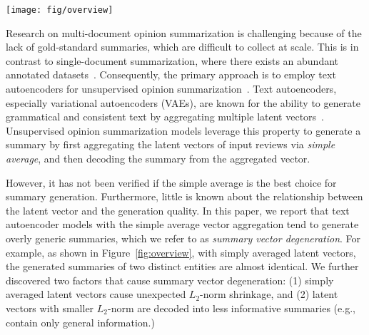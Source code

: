 \documentclass[11pt]{article}
\newcommand{\aggname}{\textsc{Coop}}
\newcommand{\hl}[1]{#1}
\begin{document}
\begin{figure*}[t]
    \centering
    \texttt{[image: fig/overview]}
    \caption{
    Illustration of the latent space $\mathcal{Z}$ and text space $\mathcal{X}$.
    The de facto standard approach in unsupervised opinion summarization uses the simple average of input review vectors $\boldsymbol{z}_{\text{review}}$ ($\circ$) to obtain the summary vector $\boldsymbol{z}_{\text{avg}}$ ($\smallblacktriangleup$).
    The simply averaged vector $\boldsymbol{z}_{\text{avg}}$ tends to be close to the center (i.e., has a small $L_2$-norm) in the latent space, and a generated summary $\boldsymbol{x}_{\text{avg}}$
    ($\smallblackdiamond$) tends to become overly generic.
    Our proposed framework \aggname{} finds a better aggregated vector to generate a more specific summary $\boldsymbol{x}_{\aggname{}}$($\smallblacksquare$) from the latent vector $\boldsymbol{z}_{\text{\aggname{}}}$ ($\star$).}
    \label{fig:overview}
\end{figure*}

Research on multi-document opinion summarization is challenging because of the lack of gold-standard summaries, which are difficult to collect at scale. This is in contrast to single-document summarization, where there exists an abundant annotated datasets~\cite{usnews,hermann2015teaching,rush-etal-2015-neural,narayan-etal-2018-dont}.
Consequently, the primary approach is to employ text autoencoders for unsupervised opinion summarization~\cite{Chu:2019:MeanSum,brazinskas-etal-2020-unsupervised}.
Text autoencoders, especially variational autoencoders (VAEs), are known for the ability to generate \hl{grammatical and consistent text by aggregating} multiple latent vectors~\cite{bowman-etal-2016-generating}.
Unsupervised opinion summarization models leverage this property to generate a summary by first aggregating the latent vectors of input reviews via {\em simple average}, and then decoding the summary from the aggregated vector.

However, it has not been verified if the simple average is the best choice for summary generation. Furthermore, little is known about the relationship between the latent vector and the generation quality. 
In this paper, we report that text autoencoder models with the simple average vector aggregation tend to generate overly generic summaries, which we refer to as {\em summary vector degeneration}. For example, as shown in Figure~\ref{fig:overview}, with simply averaged latent vectors, the generated summaries of two distinct entities are almost identical. 
We further discovered two factors that cause summary vector degeneration: (1) simply averaged latent vectors cause unexpected $L_2$-norm shrinkage, and (2) latent vectors with smaller $L_2$-norm are decoded into less informative summaries (e.g., contain only general information.)
\end{document}
